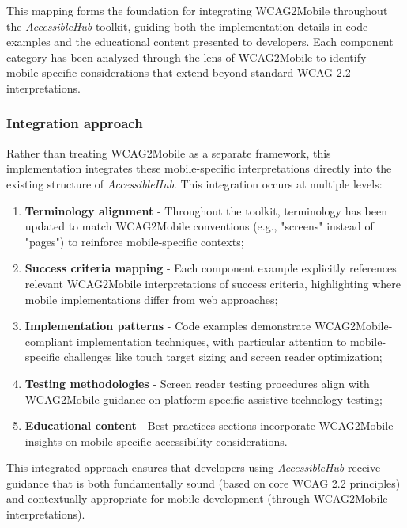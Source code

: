 This mapping forms the foundation for integrating WCAG2Mobile throughout the \textit{AccessibleHub} toolkit, guiding both the implementation details in code examples and the educational content presented to developers. Each component category has been analyzed through the lens of WCAG2Mobile to identify mobile-specific considerations that extend beyond standard WCAG 2.2 interpretations.

\subsubsection{Integration approach}

Rather than treating WCAG2Mobile as a separate framework, this implementation integrates these mobile-specific interpretations directly into the existing structure of \textit{AccessibleHub}. This integration occurs at multiple levels:

\begin{enumerate}
    \item \textbf{Terminology alignment} - Throughout the toolkit, terminology has been updated to match WCAG2Mobile conventions (e.g., "screens" instead of "pages") to reinforce mobile-specific contexts;
    
    \item \textbf{Success criteria mapping} - Each component example explicitly references relevant WCAG2Mobile interpretations of success criteria, highlighting where mobile implementations differ from web approaches;
    
    \item \textbf{Implementation patterns} - Code examples demonstrate WCAG2Mobile-compliant implementation techniques, with particular attention to mobile-specific challenges like touch target sizing and screen reader optimization;
    
    \item \textbf{Testing methodologies} - Screen reader testing procedures align with WCAG2Mobile guidance on platform-specific assistive technology testing;
    
    \item \textbf{Educational content} - Best practices sections incorporate WCAG2Mobile insights on mobile-specific accessibility considerations.
\end{enumerate}

This integrated approach ensures that developers using \textit{AccessibleHub} receive guidance that is both fundamentally sound (based on core WCAG 2.2 principles) and contextually appropriate for mobile development (through WCAG2Mobile interpretations).

